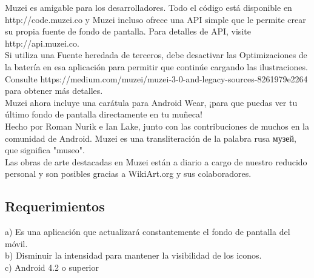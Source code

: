 \documentclass[12pt,a4paper]{article}
\begin{document}
Muzei es amigable para los desarrolladores. Todo el código está disponible en http://code.muzei.co y Muzei incluso ofrece una API simple que le permite crear su propia fuente de fondo de pantalla. Para detalles de API, visite http://api.muzei.co.\\

Si utiliza una Fuente heredada de terceros, debe desactivar las Optimizaciones de la batería en esa aplicación para permitir que continúe cargando las ilustraciones. Consulte https://medium.com/muzei/muzei-3-0-and-legacy-sources-8261979e2264 para obtener más detalles.\\


Muzei ahora incluye una carátula para Android Wear, ¡para que puedas ver tu último fondo de pantalla directamente en tu muñeca!\\


Hecho por Roman Nurik e Ian Lake, junto con las contribuciones de muchos en la comunidad de Android. Muzei es una transliteración de la palabra rusa музей, que significa "museo".\\

Las obras de arte destacadas en Muzei están a diario a cargo de nuestro reducido personal y son posibles gracias a WikiArt.org y sus colaboradores.\\


\subsection{Requerimientos}
a)	Es una aplicación que actualizará constantemente el fondo de pantalla del móvil.\\
b)	Disminuir la intensidad para mantener la visibilidad de los iconos.\\
c)	Android 4.2 o superior\\
\end{document}
